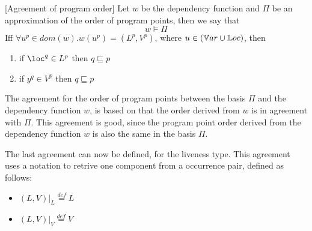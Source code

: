 \documentclass[../../master.tex]{subfiles}
\begin{document}

\begin{definition}{[Agreement of program order]}
	Let $w$ be the dependency function and $\Pi$ be an approximation of the order of program points, then we say that
	$$w\models\Pi$$
	Iff $\forall u^p\in dom(w).w(u^p)=(L^p,V^p)$, where $u\in(\mathbb{V}ar\cup\mathbb{L}oc)$, then
	\begin{enumerate}
		\item if $\loc^q\in L^p$ then $q\sqsubseteq p$
		\item if $y^q\in V^p$ then $q\sqsubseteq p$
	\end{enumerate}
	\iffalse
	\begin{itemize}
		\item $(p,q)\in\Pi \Rightarrow \exists x,y. x^p\in dom(w) \wedge y^q\in dom(w)$
		\item $w(u^p)=(L^p,V^p)$, where $u\in\Var\cup\Loc)$, then
		\begin{enumerate}
			\item if $\loc^q\in L^p$ then $q\sqsubseteq p$
			\item if $y^q\in V^p$ then $q\sqsubseteq p$
		\end{enumerate}
	\end{itemize}
	\fi
\end{definition}

The agreement for the order of program points between the basis $\Pi$ and the dependency function $w$, is based on that the order derived from $w$ is in agreement with $\Pi$.
This agreement is good, since the program point order derived from the dependency function $w$ is also the same in the basis $\Pi$.
\bigskip

The last agreement can now be defined, for the liveness type.
This agreement uses a notation to retrive one component from a occurrence pair, defined as follows:

\begin{itemize}
	\item $(L,V)|_L \overset{def}{=} L$
	\item $(L,V)|_V \overset{def}{=} V$
\end{itemize}
\end{document}
